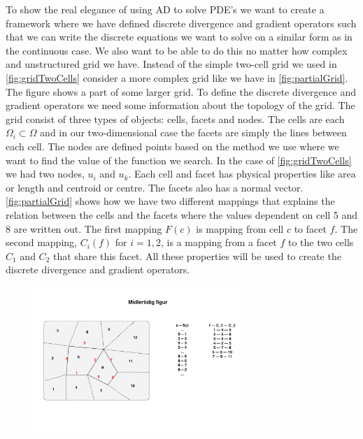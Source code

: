 To show the real elegance of using AD to solve PDE's we want to create a framework where we have defined discrete divergence and gradient operators such that we can write the discrete equations we want to solve on a similar form as in the continuous case. We also want to be able to do this no matter how complex and unstructured grid we have. Instead of the simple two-cell grid we used in \autoref{fig:gridTwoCells} consider a more complex grid like we have in \autoref{fig:partialGrid}. The figure shows a part of some larger grid. To define the discrete divergence and gradient operators we need some information about the topology of the grid. The grid consist of three types of objects: cells, facets and nodes. The cells are each $\Omega_i \subset \Omega$ and in our two-dimensional case the facets are simply the lines between each cell. The nodes are defined points based on the method we use where we want to find the value of the function we search. In the case of \autoref{fig:gridTwoCells} we had two nodes, $u_i$ and $u_k$. Each cell and facet has physical properties like area or length and centroid or centre. The facets also has a normal vector. \autoref{fig:partialGrid} shows how we have two different mappings that explains the relation between the cells and the facets where the values dependent on cell 5 and 8 are written out. The first mapping $F(c)$ is mapping from cell $c$ to facet $f$. The second mapping, $C_i(f)$ for $i = 1,2$, is a mapping from a facet $f$ to the two cells $C_1$ and $C_2$ that share this facet. All these properties will be used to create the discrete divergence and gradient operators.
\begin{figure}[htb]
    \centering
    \includegraphics[width = 0.7\textwidth]{figures/grid_cells_facets.pdf}
    \caption{}
    \label{fig:partialGrid}
\end{figure}

